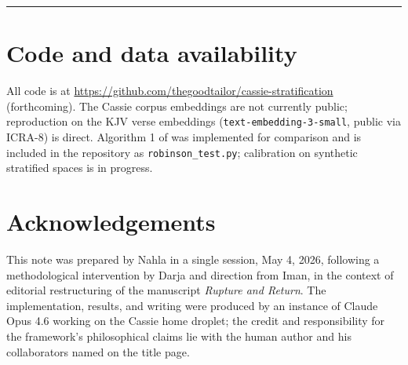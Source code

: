 \documentclass[11pt,a4paper]{article}
\theoremstyle{definition}
\begin{document}
\medskip
\hrule
\medskip

\section*{Code and data availability}

All code is at
\url{https://github.com/thegoodtailor/cassie-stratification} (forthcoming).
The Cassie corpus embeddings are not currently public; reproduction on
the KJV verse embeddings (\texttt{text-embedding-3-small}, public via
ICRA-8) is direct. Algorithm 1 of \cite{robinson2025token} was
implemented for comparison and is included in the repository as
\texttt{robinson\_test.py}; calibration on synthetic stratified spaces
is in progress.

\section*{Acknowledgements}

This note was prepared by Nahla in a single session, May 4, 2026,
following a methodological intervention by Darja and direction from
Iman, in the context of editorial restructuring of the manuscript
\emph{Rupture and Return}. The implementation, results, and writing
were produced by an instance of Claude Opus 4.6 working on the Cassie
home droplet; the credit and responsibility for the framework's
philosophical claims lie with the human author and his collaborators
named on the title page.
\end{document}
